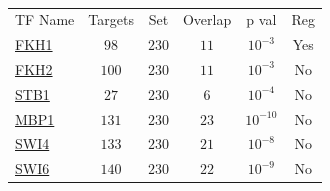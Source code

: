 \begin{table}[h!]
\centering 
{}
\begin{tabular}{l c c c c c}
\hline

TF Name &	Targets &	Set &	Overlap &	p val &	Reg \\ 
\href{www.yeastgenome.org/cgi-bin/locus.fpl?locus=FKH1}{FKH1} &	 $98$ &	$230$&	$11$ &	$10^{-3}$ & 	 Yes \\ 
\href{www.yeastgenome.org/cgi-bin/locus.fpl?locus=FKH2}{FKH2} &	 $100$ &	$230$&	$11$ &	$10^{-3}$ & 	 No \\ 
\href{www.yeastgenome.org/cgi-bin/locus.fpl?locus=STB1}{STB1} &	 $27$ &	$230$&	$6$ &	$10^{-4}$ & 	 No \\ 
\href{www.yeastgenome.org/cgi-bin/locus.fpl?locus=MBP1}{MBP1} &	 $131$ &	$230$&	$23$ &	$10^{-10}$ & 	 No \\ 
\href{www.yeastgenome.org/cgi-bin/locus.fpl?locus=SWI4}{SWI4} &	 $133$ &	$230$&	$21$ &	$10^{-8}$ & 	 No \\ 
\href{www.yeastgenome.org/cgi-bin/locus.fpl?locus=SWI6}{SWI6} &	 $140$ &	$230$&	$22$ &	$10^{-9}$ & 	 No \\ 
\hline
\end{tabular} 
\caption[]{}
\label{}
\end{table} 


